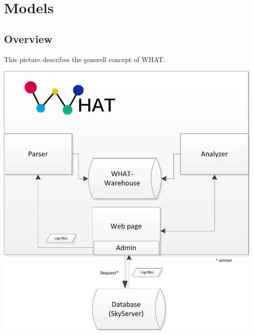 \section{Models}

% 
% 
% 
% 
% 
% 
% 
% 
% 



\subsection{Overview}\label{overview}
This picture describes the generell concept of WHAT.
\begin{center}
\includegraphics[width=1\linewidth]{Pictures/GenerellConcept.png}
\end{center} 
\newpage
